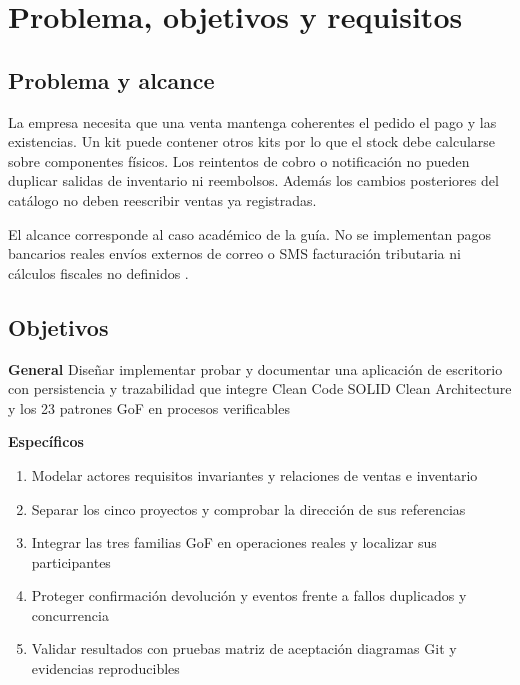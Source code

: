 
\section{Problema, objetivos y requisitos}
\subsection{Problema y alcance}
La empresa necesita que una venta mantenga coherentes el pedido el pago y las existencias. Un kit puede contener otros kits por lo que el stock debe calcularse sobre componentes físicos. Los reintentos de cobro o notificación no pueden duplicar salidas de inventario ni reembolsos. Además los cambios posteriores del catálogo no deben reescribir ventas ya registradas.

El alcance corresponde al caso académico de la guía. No se implementan pagos bancarios reales envíos externos de correo o SMS facturación tributaria ni cálculos fiscales no definidos \cite{guia}.

\subsection{Objetivos}
\textbf{General} Diseñar implementar probar y documentar una aplicación de escritorio con persistencia y trazabilidad que integre Clean Code SOLID Clean Architecture y los 23 patrones GoF en procesos verificables

\textbf{Específicos}
\begin{enumerate}[label=O\arabic*,leftmargin=1.2cm]
\item Modelar actores requisitos invariantes y relaciones de ventas e inventario
\item Separar los cinco proyectos y comprobar la dirección de sus referencias
\item Integrar las tres familias GoF en operaciones reales y localizar sus participantes
\item Proteger confirmación devolución y eventos frente a fallos duplicados y concurrencia
\item Validar resultados con pruebas matriz de aceptación diagramas Git y evidencias reproducibles
\end{enumerate}

